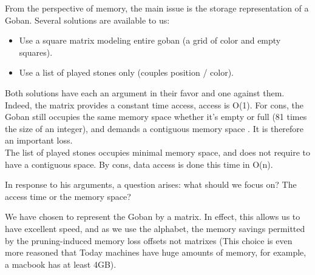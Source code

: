 \documentclass[11pt,a4paper]{report}
\begin{document}
From the perspective of memory, the main issue is the storage representation of a Goban. Several solutions are available to us: \\
     
 \begin{itemize}
\item    Use a square matrix modeling entire goban (a grid of color and empty squares). 
\item    Use a list of played stones only (couples position / color). 
\end{itemize}
\bigskip

Both solutions have each an argument in their favor and one against them. \\

Indeed, the matrix provides a constant time access, access is O(1). For cons, the Goban still occupies the same memory space whether it's empty or full (81 times the size of an integer), and demands a contiguous memory space . It is therefore an important loss. \\

The list of played stones occupies minimal memory space, and does not require to have a contiguous space. By cons, data access is done this time  in O(n). 
\bigskip



In response to his arguments, a question arises: what should we focus on? The access time or the memory space? 

We have chosen to represent the Goban by a matrix. In effect, this allows us to have excellent speed, and as we use the alphabet, the memory savings permitted by the pruning-induced memory loss offsets not matrixes (This choice is even more reasoned that Today machines have huge amounts of memory, for example, a macbook has at least 4GB).
\end{document}
